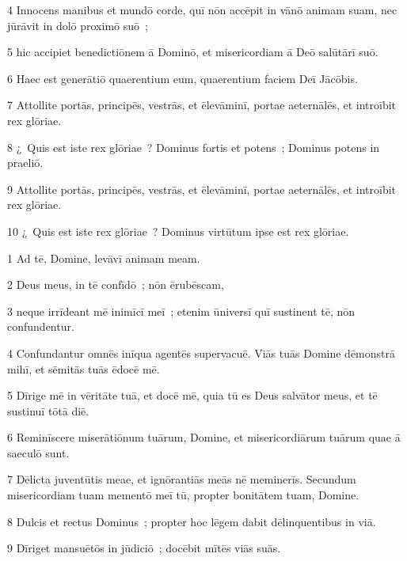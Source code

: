 \psalmVerse
  {\phantom{00}4}
  {Innocens manibus et mundō corde, quī nōn accēpit in vānō animam suam, nec jūrāvit in dolō proximō suō~;}


\psalmVerse
  {\phantom{00}5}
  {hic accipiet benedictiōnem ā Dominō, et misericordiam ā Deō salūtārī suō.}


\psalmVerse
  {\phantom{00}6}
  {Haec est generātiō quaerentium eum, quaerentium faciem Deī Jācōbis.}


\psalmVerse
  {\phantom{00}7}
  {Attollite portās, principēs, vestrās, et ēlevāminī, portae aeternālēs, et introībit rex glōriae.}


\psalmVerse
  {\phantom{00}8}
  {¿~Quis est iste rex glōriae~? Dominus fortis et potens~; Dominus potens in praeliō.}


\psalmVerse
  {\phantom{00}9}
  {Attollite portās, principēs, vestrās, et ēlevāminī, portae aeternālēs, et introībit rex glōriae.}


\psalmVerse
  {\phantom{0}10}
  {¿~Quis est iste rex glōriae~? Dominus virtūtum ipse est rex glōriae.}




\psalmVerse
  {\phantom{00}1}
  {Ad tē, Domine, levāvī animam meam.}


\psalmVerse
  {\phantom{00}2}
  {Deus meus, in tē confīdō~; nōn ērubēscam,}


\psalmVerse
  {\phantom{00}3}
  {neque irrīdeant mē inimīcī meī~; etenim ūniversī quī sustinent tē, nōn confundentur.}


\psalmVerse
  {\phantom{00}4}
  {Confundantur omnēs inīqua agentēs supervacuē. Viās tuās Domine dēmonstrā mihī, et sēmitās tuās ēdocē mē.}


\psalmVerse
  {\phantom{00}5}
  {Dīrige mē in vēritāte tuā, et docē mē, quia tū es Deus salvātor meus, et tē sustinuī tōtā diē.}


\psalmVerse
  {\phantom{00}6}
  {Reminīscere miserātiōnum tuārum, Domine, et misericordiārum tuārum quae ā saeculō sunt.}


\psalmVerse
  {\phantom{00}7}
  {Dēlicta juventūtis meae, et ignōrantiās meās nē meminerīs. Secundum misericordiam tuam mementō meī tū, propter bonitātem tuam, Domine.}


\psalmVerse
  {\phantom{00}8}
  {Dulcis et rectus Dominus~; propter hoc lēgem dabit dēlinquentibus in viā.}


\psalmVerse
  {\phantom{00}9}
  {Dīriget mansuētōs in jūdiciō~; docēbit mītēs viās suās.}


